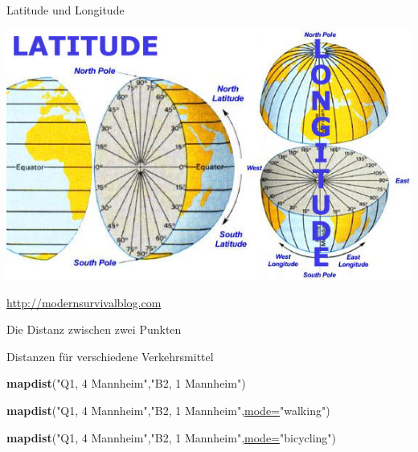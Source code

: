 \documentclass[ignorenonframetext,]{beamer}
\newenvironment{Shaded}{\begin{snugshade}}{\end{snugshade}}
\newcommand{\DataTypeTok}[1]{\textcolor[rgb]{0.74,0.68,0.62}{\underline{#1}}}
\newcommand{\KeywordTok}[1]{\textcolor[rgb]{0.26,0.66,0.93}{\textbf{#1}}}
\newcommand{\NormalTok}[1]{\textcolor[rgb]{0.74,0.68,0.62}{#1}}
\newcommand{\StringTok}[1]{\textcolor[rgb]{0.02,0.61,0.04}{#1}}
\begin{document}
\begin{frame}{Latitude und Longitude}
\protect\hypertarget{latitude-und-longitude}{}

\includegraphics{figure/definition-of-latitude-longitude.jpg}

\href{http://modernsurvivalblog.com/survival-skills/basic-map-reading-latitude-longitude/}{http://modernsurvivalblog.com}

\end{frame}

\begin{frame}[fragile]{Die Distanz zwischen zwei Punkten}
\protect\hypertarget{die-distanz-zwischen-zwei-punkten}{}

\begin{block}{Distanzen für verschiedene Verkehrsmittel}

\begin{Shaded}
\begin{Highlighting}[]
\KeywordTok{mapdist}\NormalTok{(}\StringTok{"Q1, 4 Mannheim"}\NormalTok{,}\StringTok{"B2, 1 Mannheim"}\NormalTok{)}
\end{Highlighting}
\end{Shaded}

\begin{Shaded}
\begin{Highlighting}[]
\KeywordTok{mapdist}\NormalTok{(}\StringTok{"Q1, 4 Mannheim"}\NormalTok{,}\StringTok{"B2, 1 Mannheim"}\NormalTok{,}\DataTypeTok{mode=}\StringTok{"walking"}\NormalTok{)}
\end{Highlighting}
\end{Shaded}

\begin{Shaded}
\begin{Highlighting}[]
\KeywordTok{mapdist}\NormalTok{(}\StringTok{"Q1, 4 Mannheim"}\NormalTok{,}\StringTok{"B2, 1 Mannheim"}\NormalTok{,}\DataTypeTok{mode=}\StringTok{"bicycling"}\NormalTok{)}
\end{Highlighting}
\end{Shaded}

\end{block}

\end{frame}
\end{document}
